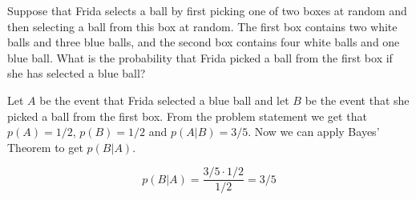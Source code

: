 \documentclass[../main.tex]{subfiles}
\begin{document}
Suppose that Frida selects a ball by first picking one of two boxes at random and then selecting a ball from this box at random.
The first box contains two white balls and three blue balls, and the second box contains four white balls and one blue ball.
What is the probability that Frida picked a ball from the first box if she has selected a blue ball?

\solution

Let $A$ be the event that Frida selected a blue ball and let $B$ be the event that she picked a ball from the first box.
From the problem statement we get that $p(A) = 1/2$, $p(B) = 1/2$ and $p(A|B) = 3/5$. Now we can apply Bayes' Theorem
to get $p(B|A)$.

\[ p(B|A) = \frac{3/5 \cdot 1/2}{1/2} = 3/5 \]
\end{document}
